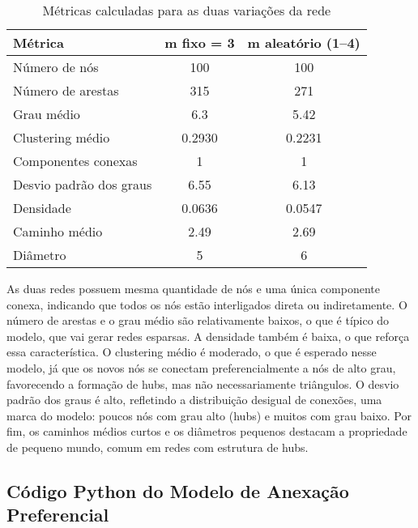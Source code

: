 \documentclass[a4paper]{article}
\begin{document}
\begin{table}[h]
\centering
\begin{tabular}{|l|c|c|}
\hline
\textbf{Métrica} & \textbf{m fixo = 3} & \textbf{m aleatório (1–4)} \\
\hline
Número de nós & 100 & 100 \\
Número de arestas & 315 & 271 \\
Grau médio & 6.3 & 5.42 \\
Clustering médio & 0.2930 & 0.2231 \\
Componentes conexas & 1 & 1 \\
Desvio padrão dos graus & 6.55 & 6.13 \\
Densidade & 0.0636 & 0.0547 \\
Caminho médio & 2.49 & 2.69 \\
Diâmetro & 5 & 6 \\
\hline
\end{tabular}
\caption{Métricas calculadas para as duas variações da rede}
\label{tab:metricas_rede}
\end{table}

As duas redes possuem mesma quantidade de nós e uma única componente conexa, indicando que todos os nós estão interligados direta ou indiretamente. O número de arestas e o grau médio são relativamente baixos, o que é típico do modelo, que vai gerar redes esparsas. A densidade também é baixa, o que reforça essa característica. O clustering médio é moderado, o que é esperado nesse modelo, já que os novos nós se conectam preferencialmente a nós de alto grau, favorecendo a formação de hubs, mas não necessariamente triângulos. O desvio padrão dos graus é alto, refletindo a distribuição desigual de conexões, uma marca do modelo: poucos nós com grau alto (hubs) e muitos com grau baixo. Por fim, os caminhos médios curtos e os diâmetros pequenos destacam a propriedade de pequeno mundo, comum em redes com estrutura de hubs.

\newpage

\subsection{Código Python do Modelo de Anexação Preferencial}
\end{document}
